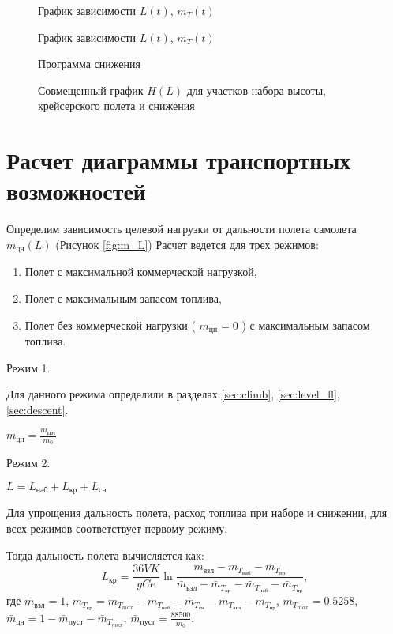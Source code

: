 \begin{figure}[H]
\centering
\resizebox{.79\linewidth}{!}{}
\caption{График зависимости $L(t)$, $m_{T}(t)$}
\label{fig:param_des}
\end{figure}

\begin{figure}[H]
\centering
\resizebox{.79\linewidth}{!}{}
\caption{График зависимости $L(t)$, $m_{T}(t)$}
\label{fig:L_t_des}
\end{figure}
 
\begin{figure}[H]
\centering
\resizebox{.79\linewidth}{!}{}
\caption{Программа снижения}
\label{fig:H_M_des}
\end{figure}

\begin{figure}[H]
\centering
\resizebox{.79\linewidth}{!}{}
\caption{Совмещенный график $H(L)$ для участков набора высоты, крейсерского полета и снижения}
\label{fig:H_L}
\end{figure}

\section{Расчет диаграммы транспортных возможностей}
Определим зависимость целевой нагрузки от дальности полета самолета
$m_{цн}(L)$ (Рисунок \ref{fig:m_L})
Расчет ведется для трех режимов:
\begin{enumerate}
    \item Полет с максимальной коммерческой нагрузкой,
    \item Полет с максимальным запасом топлива,
    \item Полет без коммерческой нагрузки ( $m_{цн}=0$ ) с максимальным запасом топлива.
\end{enumerate}

Режим 1.

Для данного режима определили в разделах \ref{sec:climb}, \ref{sec:level_fl}, \ref{sec:descent}.

$m_{цн} = \frac{m_{ЦН}}{m_0}$

Режим 2.

$ L = L_{наб} + L_{кр} + L_{сн} $

Для упрощения дальность полета, расход топлива при наборе и снижении,
для всех режимов соответствует первому режиму.

Тогда дальность полета вычисляется как:
\begin{equation}
    L_{кр} = \frac{36 V K}{gCe} \ln{\frac{\bar{m}_{взл} - \bar{m}_{T_{наб}} - \bar{m}_{T_{пр}}}{\bar{m}_{взл}-\bar{m}_{T_{кр}}-\bar{m}_{T_{наб}} - \bar{m}_{T_{пр}}}},
\end{equation}
где $ \bar{m}_{взл} = 1 $, $ \bar{m}_{T_{кр}} = \bar{m}_{T_{max}}- \bar{m}_{T_{наб}} - \bar{m}_{T_{сн}} -
\bar{m}_{T_{анз}} - \bar{m}_{T_{пр}} $, $ \bar{m}_{T_{max}} = 0.5258 $, $
\bar{m}_{цн} = 1 - \bar{m}_{пуст} - \bar{m}_{T_{max}} $, $ \bar{m}_{пуст} =
\frac{88500}{m_0} $.

